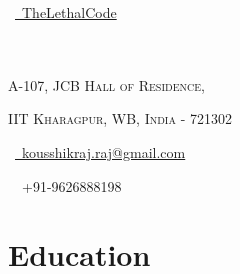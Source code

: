 \documentclass[a4paper,10pt]{extarticle} %
\begin{document}
  
  \pagestyle{empty} %
  
  \begin{multicols}{3}
  \normalsize \faGithub\ {\href{https://github.com/TheLethalCode}{\  TheLethalCode}}\\
  \normalsize {}\\
  \normalsize {}\\
  \columnbreak
  \normalsize\par{\par} %
  \par{\centering\normalsize {\textsc{A-107, JCB Hall of Residence, }}\hfill\par}
  \vspace{-0.2cm}
  \par{\centering\normalsize {\textsc{IIT Kharagpur, WB, India - 721302 }}\hfill\par}
  
  \columnbreak
  \raggedright\hfill\normalsize \faEnvelope\ {\href{mailto:kousshikraj.raj@gmail.com}{\  kousshikraj.raj@gmail.com}}\\
  \raggedright\hfill{\faPhone\ \  +91-9626888198}
  \end{multicols}
  
  
  \vspace{-0.6cm}
  \section{\textcolor{primary}{Education}}
  
\end{document}
